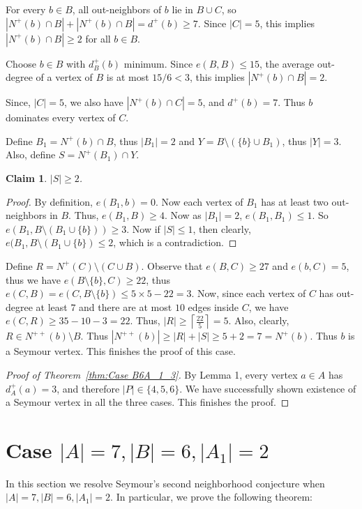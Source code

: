 \documentclass[a4paper,fleqn]{cas-sc}
\newtheorem{claim}[theorem]{Claim}
\theoremstyle{definition}
\begin{document}
For every $b\in B$, all out-neighbors of $b$ lie in $B\cup C$, so $|N^+(b)\cap B|+|N^+(b)\cap B|=d^+(b)\ge 7$. Since $|C|=5$, this implies $|N^+(b)\cap B|\ge 2$ for all \(b\in B\). 


Choose $b\in B$ with $d_B^+(b)$ minimum. Since $e(B,B)\le 15$, the average out-degree of a vertex of $B$ is at most $15/6<3$, this implies $|N^+(b)\cap B|=2$.

Since, $|C|=5$, we also have $|N^+(b)\cap C|=5$, and $d^+(b)=7$. Thus $b$ dominates every vertex of $C$.

Define $B_1=N^+(b)\cap B$, thus $|B_1|=2$ and $Y=B\setminus (\{b\}\cup B_1)$, thus $|Y|=3$. Also, define $S=N^+(B_1)\cap Y$.


\begin{claim}
$|S|\ge 2$.
\end{claim}

\begin{proof}
By definition, $e(B_1, b)=0$. Now each vertex of $B_1$ has at least two out-neighbors in $B$. Thus, $e(B_1,B)\geq 4$. Now as $|B_1|=2$, $e(B_1,B_1)\leq 1$. So $e(B_1, B\setminus (B_1\cup \{b\}))\geq 3$. Now if $|S|\leq 1$, then clearly, $e(B_1, B\setminus (B_1\cup \{b\})\leq 2$, which is a contradiction.
\end{proof}



Define $R=N^+(C)\setminus (C\cup B)$.
Observe that $e(B,C)\geq 27$ and $e(b,C)=5$, thus we have $e(B\setminus \{b\},C)\geq 22$, thus $e(C,B)=e(C,B\setminus \{b\})\leq 5\times 5-22=3$. Now, since each vertex of $C$ has out-degree at least $7$ and there are at most $10$ edges inside $C$, we have $e(C,R)\geq 35-10-3=22$. Thus, $|R|\ge \left\lceil\frac{22}{5}\right\rceil=5$. Also, clearly, $R\in N^{++}(b)\setminus B$. Thus $|N^{++}(b)|\geq |R|+ |S|\geq 5+2=7=N^+(b)$. Thus $b$ is a Seymour vertex. This finishes the proof of this case.



\begin{proof}[Proof of Theorem~\ref{thm:Case B6A_1_3}]

By Lemma 1, every vertex $a\in A$ has $d_A^+(a)=3$, and therefore $|P|\in \{4,5,6\}$. We have successfully shown existence of a Seymour vertex in all the three cases. This finishes the proof.
\end{proof}

\section{Case  $|A|=7, |B|=6, |A_1|=2$}\label{sec:B6A12}
In this section we resolve Seymour’s second neighborhood conjecture when $|A| = 7, |B| = 6, |A_1|=2$. In particular, we prove the following theorem:
\end{document}
